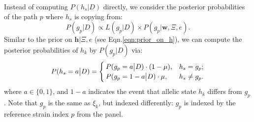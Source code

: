 \documentclass{bioinfo}
\begin{document}
Instead of computing $P(h_s |D)$ directly, we consider the posterior probabilities of the path $p$ where $h_s$ is copying from:
\begin{equation}
P(g_p |D) \propto  L(g_p |D) \times P(g_p|\mathbf{w}, \Xi, e).\label{eqn:post_gp}
\end{equation}
Similar to the prior on $\mathbf{h}| \Xi, e$ (see Eqn.\eqref{eqn:prior_on_h}), we can compute the posterior probabilities of $h_k$ by $P(g_p |D)$ via:
\begin{equation}
P(h_{s} = a \big{|} D) =
\begin{cases}
P(g_{p} = a \big{|} D) \cdot (1-\mu), & h_s = g_p;\\
P(g_{p} = 1 - a \big{|} D) \cdot \mu, & h_s \neq g_p.
\end{cases}
\label{eqn:ps0}
\end{equation}
where $a \in \{0, 1\}$, and $1-a$ indicates the event that allelic state $h_k$ differs from $g_p$. Note that $g_p$ is the same as $\xi_k$, but indexed differently: $g_p$ is indexed by the reference strain index $p$ from the panel.
\end{document}
